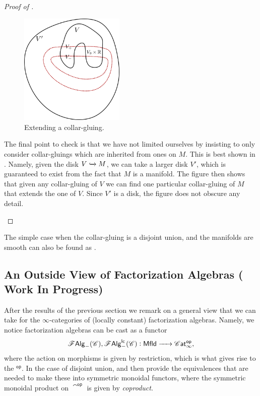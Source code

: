 \documentclass[../text]{subfiles}
\begin{document}
\begin{proof}[Proof of ]
    \begin{multicols}{2}
        \begin{figure}[H]
            \centering
            \includegraphics[width=5cm]{../images/extend_gluing.png}
            \caption{Extending a collar-gluing.}
            \label{fig:extend_gluing}
        \end{figure}
        The final point to check is that we have not limited ourselves by insisting to only consider collar-gluings which are inherited from ones on $M$. This is best shown in . Namely, given the disk $V \xhookrightarrow{} M$, we can take a larger disk $V'$, which is guaranteed to exist from the fact that $M$ is a manifold. The figure then shows that given any collar-gluing of $V$ we can find one particular collar-gluing of $M$ that extends the one of $V$. Since $V'$ is a disk, the figure does not obscure any detail.
    \end{multicols}
\end{proof}

\begin{remark}
    The simple case when the collar-gluing is a disjoint union, and the manifolds are smooth can also be found as \cite[ex.5.4.5.4]{lurie_ha}.
\end{remark}


\subsection{An Outside View of Factorization Algebras ({\color{red} Work In Progress})}

After the results of the previous section we remark on a general view that we can take for the $\infty$-categories of (locally constant) factorization algebras. Namely, we notice factorization algebras can be cast as a functor
%
\begin{equation}
    \falg_{-}(\catC), \lcfa_{-}(\catC): \mfld[r] \xrightarrow{\ \ \ \ } \cat^{\mathsf{op}},
\end{equation}
%
where the action on morphisms is given by restriction, which is what gives rise to the $^{\mathsf{op}}$. In the case of disjoint union,  and  then provide the equivalences that are needed to make these into symmetric monoidal functors, where the symmetric monoidal product on $\cat^{\mathsf{op}}$ is given by \emph{coproduct}. 
\end{document}
